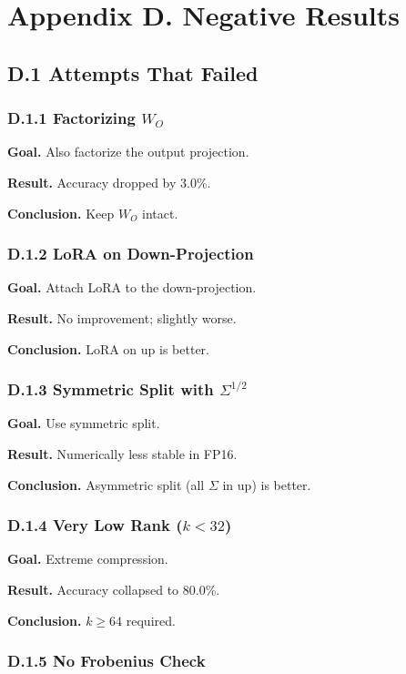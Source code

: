 \section{Appendix D. Negative Results}

\subsection{D.1 Attempts That Failed}

\subsubsection{D.1.1 Factorizing $W_O$}

\textbf{Goal.} Also factorize the output projection.

\textbf{Result.} Accuracy dropped by 3.0\%.

\textbf{Conclusion.} Keep $W_O$ intact.

\subsubsection{D.1.2 LoRA on Down-Projection}

\textbf{Goal.} Attach LoRA to the down-projection.

\textbf{Result.} No improvement; slightly worse.

\textbf{Conclusion.} LoRA on up is better.

\subsubsection{D.1.3 Symmetric Split with $\Sigma^{1/2}$}

\textbf{Goal.} Use symmetric split.

\textbf{Result.} Numerically less stable in FP16.

\textbf{Conclusion.} Asymmetric split (all $\Sigma$ in up) is better.

\subsubsection{D.1.4 Very Low Rank ($k < 32$)}

\textbf{Goal.} Extreme compression.

\textbf{Result.} Accuracy collapsed to 80.0\%.

\textbf{Conclusion.} $k \geq 64$ required.

\subsubsection{D.1.5 No Frobenius Check}

